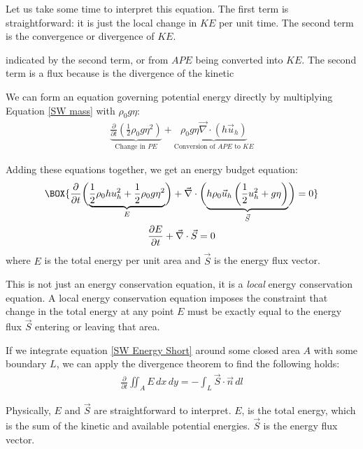 Let us take some time to interpret this equation. The first term is straightforward: it is just the local change in $KE$ per unit time. The second term is the convergence or divergence of $KE$.

indicated by the second term, or from $APE$ being converted into $KE$. The second term is a flux because is the divergence of the kinetic 

We can form an equation governing potential energy directly by multiplying Equation \ref{SW mass} with $\rho_0 g \eta$:
\begin{align*}
    \underbrace{\frac{\partial}{\partial t}\left( \frac{1}{2}\rho_0 g \eta^2\right)}_{\text{Change in }PE}
    +\underbrace{\rho_0 g \eta \vec{\nabla}\cdot \left( h\vec{u}_h \right)}_{\text{Conversion of }APE\text{ to }KE}
\end{align*}

Adding these equations together, we get an energy budget equation:
\begin{gather}
    \label{SW Energy}
    \BOX{
        \frac{\partial}{\partial t}\biggl( \underbrace{\frac{1}{2}\rho_0 h u_h^2 + \frac{1}{2}\rho_0 g \eta^2}_{E} \biggr)
        +
        \vec{\nabla}\cdot\biggl( 
            \underbrace{h\rho_0\vec{u}_h \left( \frac{1}{2}u_h^2+g\eta \right)}_{\vec{S}}
         \biggr)
        =0
    }\\
    \label{SW Energy Short}
    \frac{\partial E}{\partial t}+\vec{\nabla}\cdot\vec{S}=0
\end{gather}
where $E$ is the total energy per unit area and $\vec{S}$ is the energy flux vector. 

This is not just an energy conservation equation, it is a \textit{local} energy conservation equation. A local energy conservation equation imposes the constraint that change in the total energy at any point $E$ must be exactly equal to the energy flux $\vec{S}$ entering or leaving that area.

If we integrate equation \ref{SW Energy Short} around some closed area $A$ with some boundary $L$, we can apply the divergence theorem to find the following holds:
\begin{align*}
    \frac{\partial}{\partial t}\iint_A E \,dx\,dy = -\int_L \vec{S}\cdot\vec{n}\,dl
\end{align*}

Physically, $E$ and $\vec{S}$ are straightforward to interpret. $E$, is the total energy, which is the sum of the kinetic and available potential energies. $\vec{S}$ is the energy flux vector.

